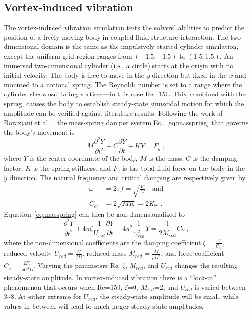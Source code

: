 \documentclass[preprint,12pt]{elsarticle}
\newcommand{ \ddt } [1] { \frac{ \partial #1 }{ \partial t } }
\newcommand{ \ddydxx } [2] { \frac{ \partial^2 #1 }{ \partial #2^2 } }
\begin{document}
\subsection{Vortex-induced vibration}
\label{sec:viv}

The vortex-induced vibration simulation tests the solvers' abilities to predict the
position of a freely moving body in coupled fluid-structure interaction.
The two-dimensional domain is the same as the impulsively started cylinder simulation,
except the uniform grid region ranges from $(-1.5, -1.5)$ to $(1.5, 1.5)$.
An immersed two-dimensional cylinder (i.e., a circle) starts at the origin with
no initial velocity. The body is free to move in the $y$ direction but fixed in the
$x$ and mounted to a notional spring. The Reynolds number is set to a range where
the cylinder sheds oscillating vortices---in this case Re=150.
This, combined with the spring, causes the body to establish steady-state sinusoidal motion
for which the amplitude can be verified against literature results.
Following the work of Borazjani et al.~\cite{borazjani2008curvilinear}, the mass-spring
damper system Eq.~\eqref{eq:masspring} that governs the body's movement is
\begin{equation}
    M \ddydxx{Y}{t} + C \ddt{Y} + KY = F_y \;, \label{eq:masspring}
\end{equation}
where $Y$ is the center coordinate of the body, $M$ is the mass, $C$ is the damping factor,
$K$ is the spring stiffness, and $F_y$ is the total fluid force on the body in the $y$ direction.
The natural frequency and critical damping are respectively given by
\begin{align}
    \omega &= 2\pi f = \sqrt{\frac{K}{M}} \quad \text{and} \label{eq:nf}\\
    C_{cr} &= 2\sqrt{MK} = 2K\omega \;. \label{eq:cd}
\end{align}
Equation~\eqref{eq:masspring} can then be non-dimensionalized to
\begin{equation}
    \frac{\partial^2 Y}{\partial t^2}+4\pi \zeta\frac{1}{U_{red}}\frac{\partial Y}{\partial t}
     + 4\pi^2\frac{1}{U_{red}^2}Y=\frac{1}{2M_{red}}C_Y \;,
     \label{eq:ndmasspring}
\end{equation}
where the non-dimensional coefficients are the damping coefficient $\zeta=\frac{C}{C_{cr}}$,
reduced velocity $U_{red}=\frac{U}{fD}$, reduced mass $M_{red}=\frac{M}{\rho D^2}$,
and force coefficient $C_Y=\frac{2F_Y}{\rho U^2 D}$. Varying the parameters Re, $\zeta$,
$M_{red}$, and $U_{red}$ changes the resulting steady-state amplitude.
In vortex-induced vibration there is a ``lock-in'' phenomenon that occurs when
Re=150, $\zeta$=0, $M_{red}$=2, and $U_{red}$ is varied between \numrange{3}{8}.
At either extreme for $U_{red}$, the steady-state amplitude will be small, while
values in between will lead to much larger steady-state amplitudes.
\end{document}
